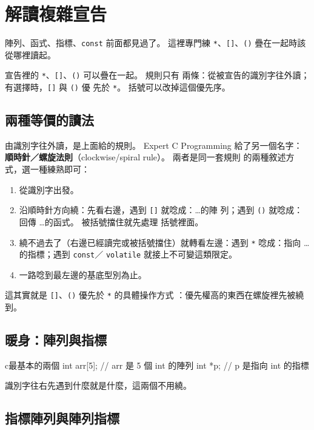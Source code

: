 \section{解讀複雜宣告}
\label{sec:decl-complex-declarations}

陣列、函式、指標、\texttt{const} 前面都見過了。 這裡專門練
\texttt{*}、\texttt{[]}、\texttt{()} 疊在一起時該從哪裡讀起。

宣告裡的 \texttt{*}、\texttt{[]}、\texttt{()} 可以疊在一起。 規則只有
兩條：從被宣告的識別字往外讀；有選擇時，\texttt{[]} 與 \texttt{()} 優
先於 \texttt{*}。 括號可以改掉這個優先序。

\subsection{兩種等價的讀法}

由識別字往外讀，是上面給的規則。 Expert C Programming 給了另一個名字：
\textbf{順時針／螺旋法則}（clockwise/spiral rule）。 兩者是同一套規則
的兩種敘述方式，選一種練熟即可：

\begin{enumerate}
\item 從識別字出發。
\item 沿順時針方向繞：先看右邊，遇到 \texttt{[]} 就唸成：\ldots 的陣
列；遇到 \texttt{()} 就唸成：回傳 \ldots 的函式。 被括號擋住就先處理
括號裡面。
\item 繞不過去了（右邊已經讀完或被括號擋住）就轉看左邊：遇到
\texttt{*} 唸成：指向 \ldots 的指標；遇到 \texttt{const}／
\texttt{volatile} 就接上不可變這類限定。
\item 一路唸到最左邊的基底型別為止。
\end{enumerate}

這其實就是 \texttt{[]}、\texttt{()} 優先於 \texttt{*} 的具體操作方式
：優先權高的東西在螺旋裡先被繞到。

\subsection{暖身：陣列與指標}

\begin{code}{c}{最基本的兩個}
int arr[5];      // arr 是 5 個 int 的陣列
int *p;          // p 是指向 int 的指標
\end{code}

識別字往右先遇到什麼就是什麼，這兩個不用繞。

\subsection{指標陣列與陣列指標}

